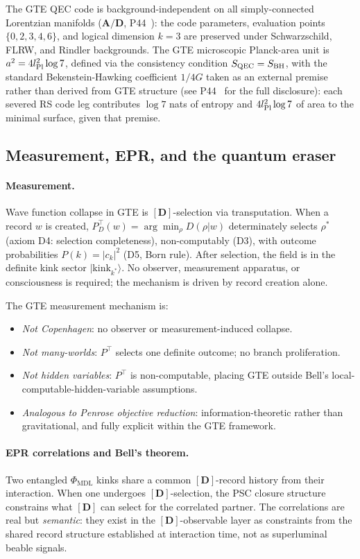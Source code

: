 \documentclass[11pt]{article}
\theoremstyle{remark}
\newcommand{\PHIMDL}{\Phi_{\mathrm{MDL}}}
\newcommand{\CatAD}{\textbf{A/D}}
\begin{document}
The GTE QEC code is background-independent on all simply-connected
Lorentzian manifolds ($\CatAD$, P44~\cite{SpivackQGR}): the code parameters,
evaluation points $\{0,2,3,4,6\}$, and logical dimension $k=3$ are preserved
under Schwarzschild, FLRW, and Rindler backgrounds.
The GTE microscopic Planck-area unit is $a^2 = 4l_{\rm Pl}^2\log 7$, defined via
the consistency condition $S_{\rm QEC} = S_{\rm BH}$, with the standard
Bekenstein-Hawking coefficient $1/4G$ taken as an external premise rather than
derived from GTE structure (see P44~\cite{SpivackQGR} for the full disclosure):
each severed RS code leg contributes $\log 7$ nats of entropy and
$4l_{\rm Pl}^2\log 7$ of area to the minimal surface, given that premise.

\subsection{Measurement, EPR, and the quantum eraser}
\label{ssec:measurement}

\paragraph{Measurement.}
Wave function collapse in GTE is $[\mathbf{D}]$-selection via transputation.
When a record $w$ is created, $P^\top_D(w) = \arg\min_\rho D(\rho|w)$
determinately selects $\rho^*$ (axiom D4: selection completeness),
non-computably (D3), with outcome probabilities $P(k) = |c_k|^2$ (D5, Born
rule).  After selection, the field is in the definite kink sector
$|\text{kink}_{k^*}\rangle$.  No observer, measurement apparatus, or
consciousness is required; the mechanism is driven by record creation alone.

The GTE measurement mechanism is:
\begin{itemize}[noitemsep]
\item \textit{Not Copenhagen}: no observer or measurement-induced collapse.
\item \textit{Not many-worlds}: $P^\top$ selects one definite outcome; no
  branch proliferation.
\item \textit{Not hidden variables}: $P^\top$ is non-computable, placing GTE
  outside Bell's local-computable-hidden-variable assumptions.
\item \textit{Analogous to Penrose objective reduction}: information-theoretic
  rather than gravitational, and fully explicit within the GTE framework.
\end{itemize}

\paragraph{EPR correlations and Bell's theorem.}
Two entangled $\PHIMDL$ kinks share a common $[\mathbf{D}]$-record history
from their interaction.  When one undergoes $[\mathbf{D}]$-selection, the PSC
closure structure constrains what $[\mathbf{D}]$ can select for the correlated
partner.  The correlations are real but \emph{semantic}: they exist in the
$[\mathbf{D}]$-observable layer as constraints from the shared record structure
established at interaction time, not as superluminal beable signals.
\end{document}
